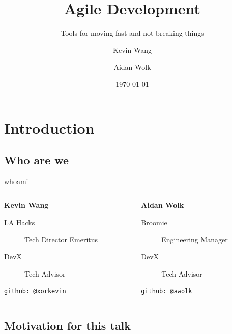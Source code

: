 \documentclass{beamer}
\title{Agile Development}
\subtitle{Tools for moving fast and not breaking things}
\author{Kevin Wang \and Aidan Wolk}
\date{\today}
\institute{DevX}
\begin{document}
\maketitle

\section{Introduction}

\subsection{Who are we}

\begin{frame}{whoami}
  \begin{columns}
    \begin{column}{0.48\textwidth}
      \textbf{\Large Kevin Wang}

      \begin{description}
        \item[LA Hacks] Tech Director Emeritus
        \item[DevX] Tech Advisor
      \end{description}

      \texttt{\tiny github: @xorkevin}
    \end{column}
    \begin{column}{0.48\textwidth}
      \textbf{\Large Aidan Wolk}

      \begin{description}
        \item[Broomie] Engineering Manager
        \item[DevX] Tech Advisor
      \end{description}

      \texttt{\tiny github: @awolk}
    \end{column}
  \end{columns}
\end{frame}

\subsection{Motivation for this talk}
\end{document}
